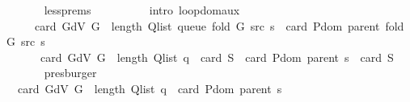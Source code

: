 \begin{isabellebody}
\ \ \ \ \ \ \isamarkupfalse%
\ less{\isachardot}{\kern0pt}prems{\isacharparenleft}{\kern0pt}{}{\isacharcomma}{\kern0pt}\ {}{\isacharcomma}{\kern0pt}\ {}{\isacharparenright}{\kern0pt}\isanewline
\ \ \ \ \ \ \isamarkupfalse%
\ {\isacharparenleft}{\kern0pt}intro\ loop{\isacharunderscore}{\kern0pt}dom{\isacharunderscore}{\kern0pt}aux{\isacharparenright}{\kern0pt}\isanewline
\ \ \ \ \isamarkupfalse%
\ \isamarkupfalse%
\isanewline
\ \ \ \ \ \ {\isachardoublequoteopen}card\ {\isacharparenleft}{\kern0pt}G{\isachardot}{\kern0pt}dV\ G{\isacharparenright}{\kern0pt}\ {\isacharplus}{\kern0pt}\ length\ {\isacharparenleft}{\kern0pt}Q{\isacharunderscore}{\kern0pt}list\ {\isacharparenleft}{\kern0pt}queue\ {\isacharparenleft}{\kern0pt}fold\ G\ src\ s{\isacharparenright}{\kern0pt}{\isacharparenright}{\kern0pt}{\isacharparenright}{\kern0pt}\ {\isacharminus}{\kern0pt}\ card\ {\isacharparenleft}{\kern0pt}P{\isachardot}{\kern0pt}dom\ {\isacharparenleft}{\kern0pt}parent\ {\isacharparenleft}{\kern0pt}fold\ G\ src\ s{\isacharparenright}{\kern0pt}{\isacharparenright}{\kern0pt}{\isacharparenright}{\kern0pt}\ {\isacharequal}{\kern0pt}\isanewline
\ \ \ \ \ \ \ card\ {\isacharparenleft}{\kern0pt}G{\isachardot}{\kern0pt}dV\ G{\isacharparenright}{\kern0pt}\ {\isacharplus}{\kern0pt}\ length\ {\isacharparenleft}{\kern0pt}Q{\isacharunderscore}{\kern0pt}list\ {\isacharquery}{\kern0pt}q{\isacharparenright}{\kern0pt}\ {\isacharplus}{\kern0pt}\ card\ {\isacharquery}{\kern0pt}S\ {\isacharminus}{\kern0pt}\ {\isacharparenleft}{\kern0pt}card\ {\isacharparenleft}{\kern0pt}P{\isachardot}{\kern0pt}dom\ {\isacharparenleft}{\kern0pt}parent\ s{\isacharparenright}{\kern0pt}{\isacharparenright}{\kern0pt}\ {\isacharplus}{\kern0pt}\ card\ {\isacharquery}{\kern0pt}S{\isacharparenright}{\kern0pt}{\isachardoublequoteclose}\isanewline
\ \ \ \ \ \ \isamarkupfalse%
\ presburger\isanewline
\ \ \ \ \isamarkupfalse%
\ \isamarkupfalse%
\ {\isachardoublequoteopen}{\isachardot}{\kern0pt}{\isachardot}{\kern0pt}{\isachardot}{\kern0pt}\ {\isacharequal}{\kern0pt}\ card\ {\isacharparenleft}{\kern0pt}G{\isachardot}{\kern0pt}dV\ G{\isacharparenright}{\kern0pt}\ {\isacharplus}{\kern0pt}\ length\ {\isacharparenleft}{\kern0pt}Q{\isacharunderscore}{\kern0pt}list\ {\isacharquery}{\kern0pt}q{\isacharparenright}{\kern0pt}\ {\isacharminus}{\kern0pt}\ card\ {\isacharparenleft}{\kern0pt}P{\isachardot}{\kern0pt}dom\ {\isacharparenleft}{\kern0pt}parent\ s{\isacharparenright}{\kern0pt}{\isacharparenright}{\kern0pt}{\isachardoublequoteclose}\isanewline

\end{isabellebody}
